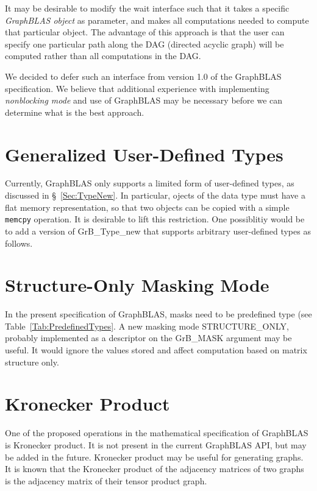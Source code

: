 It may be desirable to modify the {\sf wait} interface such that it takes a specific \emph{GraphBLAS object} as parameter, and makes all computations needed to compute that particular object. The advantage of this approach is that the user can specify one particular path along the DAG (directed acyclic graph) will be computed rather than all computations in the DAG.

We decided to defer such an interface from version 1.0 of the GraphBLAS specification. We believe that additional experience with implementing \emph{nonblocking mode} and use of GraphBLAS may be necessary before we can determine what is the best approach.


\section{Generalized User-Defined Types}

Currently, GraphBLAS only supports a limited form of user-defined types, as discussed in \S~\ref{Sec:TypeNew}. In particular, ojects of the
data type must have a flat memory representation, so that two objects can be copied with a simple {\tt memcpy} operation. 
It is desirable to lift this restriction. One possiblitiy would be to add a version of {\sf GrB\_Type\_new} that supports
arbitrary user-defined types as follows.

\section{Structure-Only Masking Mode}

 In the present specification of GraphBLAS, masks need to be predefined type (see Table~\ref{Tab:PredefinedTypes}. A new masking mode {\sf STRUCTURE\_ONLY}, probably implemented as a descriptor on the {\sf GrB\_MASK} argument may be useful. It would ignore the values stored and affect computation based on matrix structure only.
 
 \section{Kronecker Product}

One of the proposed operations in the mathematical specification of GraphBLAS is Kronecker product. It is not present in the current GraphBLAS API, but may be added in the future. Kronecker product may be useful for generating graphs. It is known that the Kronecker product of the adjacency matrices of two graphs is the adjacency matrix of their tensor product graph.

